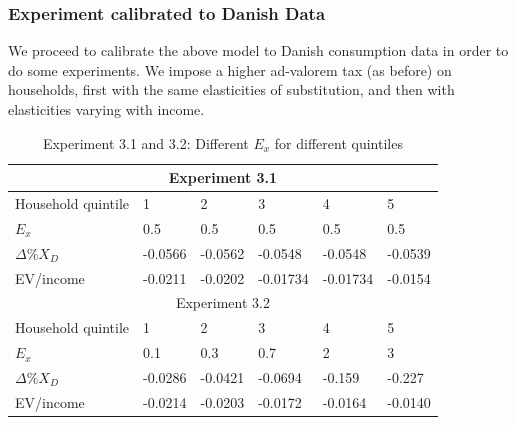 \subsubsection{Experiment calibrated to Danish Data}
We proceed to calibrate the above model to Danish consumption data in order to do some experiments. We impose a higher ad-valorem tax (as before) on households, first with the same elasticities of substitution, and then with elasticities varying with income.
\begin{table}[H]
\caption{Experiment 3.1 and 3.2: Different $E_x$ for different quintiles}
\centering
\begin{tabular}{llllll}
\multicolumn{6}{c}{Experiment 3.1} \\ \hline
Household quintile & 1 & 2 & 3 & 4 & 5 \\ 
$E_x$ & 0.5 & 0.5 & 0.5 & 0.5 & 0.5 \\
$\Delta \% X_D$ & -0.0566 & -0.0562 & -0.0548 & -0.0548 & -0.0539 \\
EV/income & -0.0211 & -0.0202 & -0.01734 & -0.01734 & -0.0154 \\ \hline
\multicolumn{6}{c}{Experiment 3.2} \\ \hline
Household quintile & 1 & 2 & 3 & 4 & 5 \\ 
$E_x$ & 0.1 & 0.3 & 0.7 & 2 & 3 \\
 $\Delta \% X_D$ & -0.0286 & -0.0421 & -0.0694 & -0.159 & -0.227 \\
EV/income & -0.0214 & -0.0203 & -0.0172 & -0.0164 & -0.0140 \\ \hline

\end{tabular}
\end{table}

